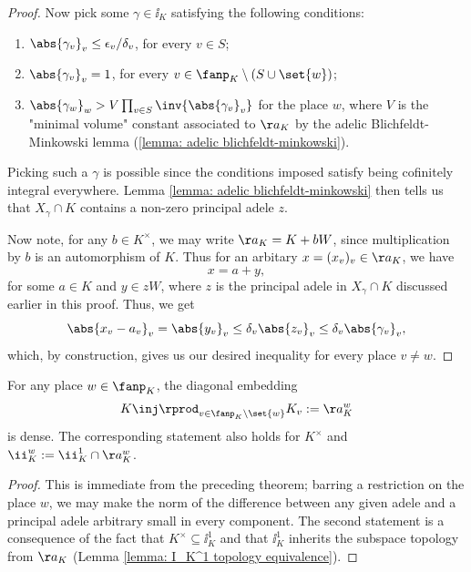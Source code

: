 \documentclass[11pt, x11names, openany]{book}
\begin{document}
\begin{proof}
Now pick some $\gamma \in \ii_K$ satisfying the following conditions:
\begin{enumerate}[1)]
    \item $\abs{\gamma_v}_v \leq \epsilon_v / \delta_v$, for every $v \in S$;
    \item $\abs{\gamma_v}_v = 1$, for every $v \in \fanp_K \setminus (S \cup \set{w})$;
    \item $\abs{\gamma_w}_w > V \prod_{v \in S} \inv{\abs{\gamma_v}_v}$ for the place $w$, where $V$ is the "minimal volume" constant associated to $\aa_K$ by the adelic Blichfeldt-Minkowski lemma (\ref{lemma: adelic blichfeldt-minkowski}). 
\end{enumerate}
 Picking such a $\gamma$ is possible since the conditions imposed satisfy being cofinitely integral everywhere. Lemma \ref{lemma: adelic blichfeldt-minkowski} then tells us that $X_\gamma \cap K$ contains a non-zero principal adele $z$.


Now note, for any $b \in K^\times$, we may write $\aa_K = K + bW$, since multiplication by $b$ is an automorphism of $K$. Thus for an arbitary $x = (x_v)_v \in \aa_K$, we have
\begin{equation*}
    x = a + y,
\end{equation*}
for some $a \in K$ and $y \in zW$, where $z$ is the principal adele in $X_\gamma \cap K$ discussed earlier in this proof. Thus, we get 
\begin{equation*}
    \abs{x_v - a_v}_v = \abs{y_v}_v \leq \delta_v \abs{z_v}_v \leq  \delta_v \abs{\gamma_v}_v,
\end{equation*}
which, by construction, gives us our desired inequality for every place $v \neq w$.
\end{proof}

\begin{corollary}
    \label{cor: strong approximation}
    For any place $w \in \fanp_K$, the diagonal embedding
    \begin{equation*}
        K \inj \rprod_{v \in \fanp_K \setminus \set{w}} K_v := \aa_K^w
    \end{equation*}
    is dense. The corresponding statement also holds for $K^\times$ and $\ii_K^w := \ii^1_K \cap \aa_K^w$.
\end{corollary}
\begin{proof}
This is immediate from the preceding theorem; barring a restriction on the place $w$, we may make the norm of the difference between any given adele and a principal adele arbitrary small in every component. The second statement is a consequence of the fact that $K^\times \subseteq \ii^1_K$ and that $\ii^1_K$ inherits the subspace topology from $\aa_K$ (Lemma \ref{lemma: I_K^1 topology equivalence}).
\end{proof}
\end{document}
